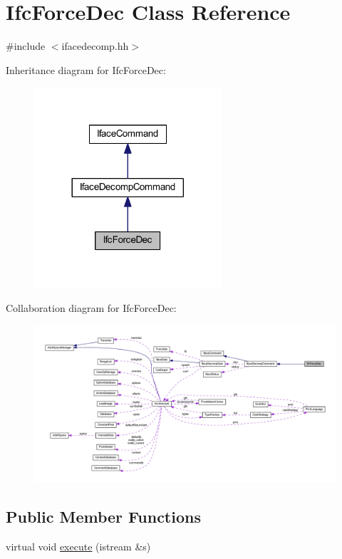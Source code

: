 \hypertarget{class_ifc_force_dec}{}\section{Ifc\+Force\+Dec Class Reference}
\label{class_ifc_force_dec}


{\ttfamily \#include $<$ifacedecomp.\+hh$>$}



Inheritance diagram for Ifc\+Force\+Dec\+:
\nopagebreak
\begin{figure}[H]
\begin{center}
\leavevmode
\includegraphics[width=197pt]{class_ifc_force_dec__inherit__graph}
\end{center}
\end{figure}


Collaboration diagram for Ifc\+Force\+Dec\+:
\nopagebreak
\begin{figure}[H]
\begin{center}
\leavevmode
\includegraphics[width=350pt]{class_ifc_force_dec__coll__graph}
\end{center}
\end{figure}
\subsection*{Public Member Functions}
\begin{DoxyCompactItemize}
\item 
virtual void \mbox{\hyperlink{class_ifc_force_dec_a3dd7a4c7396bae9c375317b916057d9d}{execute}} (istream \&s)
\end{DoxyCompactItemize}

